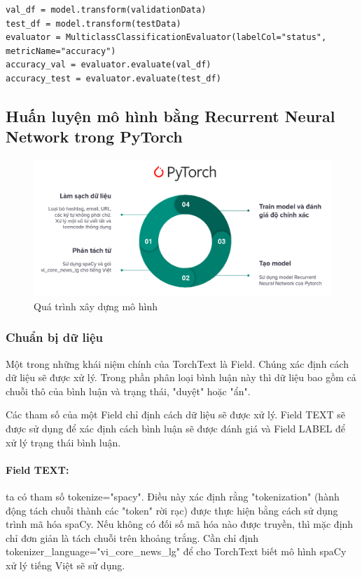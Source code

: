 \documentclass[runningheads]{llncs}
\begin{document}
\begin{lstlisting}
val_df = model.transform(validationData)
test_df = model.transform(testData)
evaluator = MulticlassClassificationEvaluator(labelCol="status", metricName="accuracy")
accuracy_val = evaluator.evaluate(val_df)
accuracy_test = evaluator.evaluate(test_df)
\end{lstlisting}

\subsection{Huấn luyện mô hình bằng Recurrent Neural Network trong PyTorch}

\begin{figure}
\includegraphics[width=\textwidth]{pytorch_cycle.png}
\caption{Quá trình xây dựng mô hình \label{figPytorchCycle}}
\end{figure}

\subsubsection{Chuẩn bị dữ liệu}

Một trong những khái niệm chính của TorchText là Field. Chúng xác định cách dữ liệu sẽ được xử lý. Trong phần phân loại bình luận này thì dữ liệu bao gồm cả chuỗi thô của bình luận và trạng thái, "duyệt" hoặc "ẩn".

Các tham số của một Field chỉ định cách dữ liệu sẽ được xử lý. Field TEXT sẽ được sử dụng để xác định cách bình luận sẽ được đánh giá và Field LABEL để xử lý trạng thái bình luận.

\paragraph{Field TEXT:}ta có tham số tokenize="spacy". Điều này xác định rằng "tokenization" (hành động tách chuỗi thành các "token" rời rạc) được thực hiện bằng cách sử dụng trình mã hóa spaCy. Nếu không có đối số mã hóa nào được truyền, thì mặc định chỉ đơn giản là tách chuỗi trên khoảng trắng. Cần chỉ định tokenizer\_language="vi\_core\_news\_lg" để cho TorchText biết mô hình spaCy xử lý tiếng Việt sẽ sử dụng.
\end{document}
